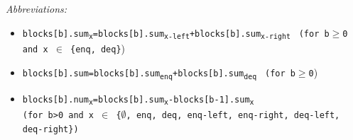 \documentclass[10pt]{article}
\newcommand{\sub}[1]{\textsubscript{#1}}
\renewcommand{\tt}[1]{\texttt{#1}}
\renewcommand{\it}[1]{\textit{#1}}
\theoremstyle{definition}
\begin{document}

\begin{footnotesize}
  

\it{Abbreviations:}
\begin{itemize}
 \item \tt{blocks[b].sum\sub{x}=blocks[b].sum\sub{x-left}+blocks[b].sum\sub{x-right}}  \tt{ (for b$\geq$0 and x $\in$ \{enq, deq\}})
 \item \tt{blocks[b].sum=blocks[b].sum\sub{enq}+blocks[b].sum\sub{deq}}  \tt{ (for b$\geq$0})
  \item \tt{blocks[b].num\sub{x}=blocks[b].sum\sub{x}-blocks[b-1].sum\sub{x}} \\ \tt{(for b>0 and x $\in$ \{$\emptyset$, enq, deq, enq-left, enq-right, deq-left, deq-right\})}
\end{itemize}
\end{footnotesize}

\pagebreak

\end{document}
